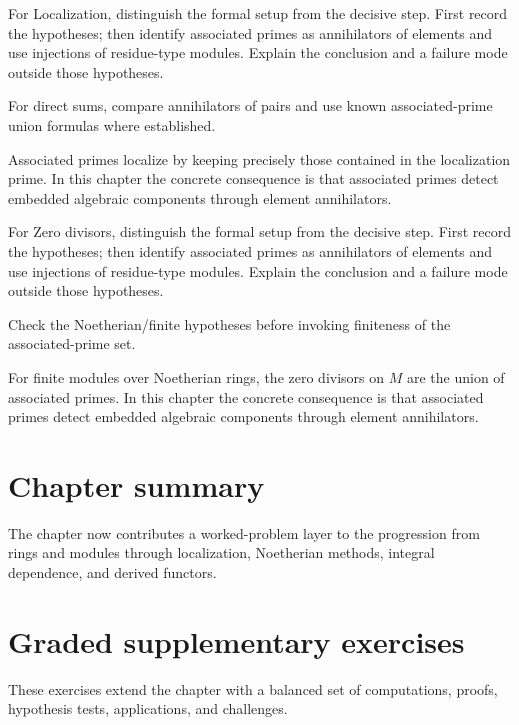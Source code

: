 \begin{exercise}\label{exr:v17-07}
For Localization, distinguish the formal setup from the decisive step. First record the hypotheses; then identify associated primes as annihilators of elements and use injections of residue-type modules. Explain the conclusion and a failure mode outside those hypotheses.
\end{exercise}
\begin{hint}
For direct sums, compare annihilators of pairs and use known associated-prime union formulas where established.
\end{hint}
\begin{solution}
Associated primes localize by keeping precisely those contained in the localization prime. In this chapter the concrete consequence is that associated primes detect embedded algebraic components through element annihilators.
\end{solution}

\begin{exercise}\label{exr:v17-08}
For Zero divisors, distinguish the formal setup from the decisive step. First record the hypotheses; then identify associated primes as annihilators of elements and use injections of residue-type modules. Explain the conclusion and a failure mode outside those hypotheses.
\end{exercise}
\begin{hint}
Check the Noetherian/finite hypotheses before invoking finiteness of the associated-prime set.
\end{hint}
\begin{solution}
For finite modules over Noetherian rings, the zero divisors on $M$ are the union of associated primes. In this chapter the concrete consequence is that associated primes detect embedded algebraic components through element annihilators.
\end{solution}

\section*{Chapter summary}
The chapter now contributes a worked-problem layer to the progression from rings and modules through localization, Noetherian methods, integral dependence, and derived functors.
\section{Graded supplementary exercises}
These exercises extend the chapter with a balanced set of computations, proofs, hypothesis tests, applications, and challenges.

